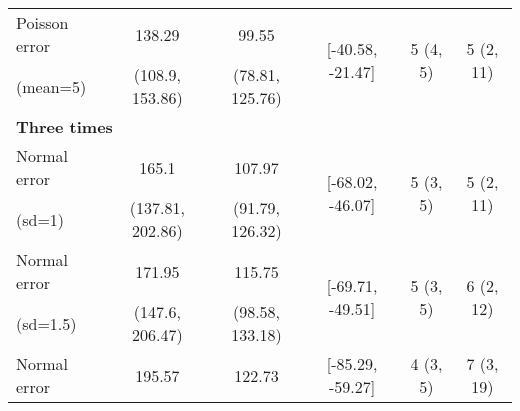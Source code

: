 \begin{table}[hbtp]
{\begin{tabular}{@{}lccccc@{}}
Poisson error        & 138.29           & 99.55           & \multirow{2}{*}{{[}-40.58, -21.47{]}}                                     & \multirow{2}{*}{5 (4, 5)}                                                  & \multirow{2}{*}{5 (2, 11)}                                                  \\
(mean=5)             & (108.9, 153.86)  & (78.81, 125.76) &                                                                           &                                                                            &                                                                             \\ \midrule
\multicolumn{6}{l}{\textbf{Three times}}                                                                                                                                                                                                                                                         \\
Normal error         & 165.1            & 107.97          & \multirow{2}{*}{{[}-68.02, -46.07{]}}                                     & \multirow{2}{*}{5 (3, 5)}                                                  & \multirow{2}{*}{5 (2, 11)}                                                  \\
(sd=1)               & (137.81, 202.86) & (91.79, 126.32) &                                                                           &                                                                            &                                                                             \\
Normal error         & 171.95           & 115.75          & \multirow{2}{*}{{[}-69.71, -49.51{]}}                                     & \multirow{2}{*}{5 (3, 5)}                                                  & \multirow{2}{*}{6 (2, 12)}                                                  \\
(sd=1.5)             & (147.6, 206.47)  & (98.58, 133.18) &                                                                           &                                                                            &                                                                             \\
Normal error         & 195.57           & 122.73          & \multirow{2}{*}{{[}-85.29, -59.27{]}}                                     & \multirow{2}{*}{4 (3, 5)}                                                  & \multirow{2}{*}{7 (3, 19)}                                                  \\

\end{tabular}}
\end{table}
